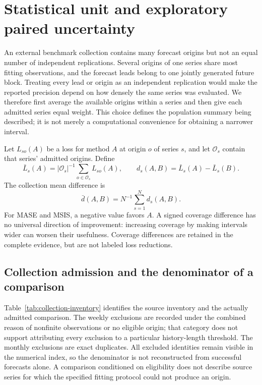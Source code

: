 \section{Statistical unit and exploratory paired uncertainty}
\label{sec:paired-uncertainty}

An external benchmark collection contains many forecast origins but not an
equal number of independent replications. Several origins of one series share
most fitting observations, and the forecast leads belong to one jointly
generated future block. Treating every lead or origin as an independent
replication would make the reported precision depend on how densely the same
series was evaluated. We therefore first average the available origins within
a series and then give each admitted series equal weight. This choice defines
the population summary being described; it is not merely a computational
convenience for obtaining a narrower interval.

Let $L_{so}(A)$ be a loss for method $A$ at origin $o$ of series $s$, and let
$\mathcal O_s$ contain that series' admitted origins. Define
\begin{equation}
 \bar L_s(A)=|\mathcal O_s|^{-1}\sum_{o\in\mathcal O_s}L_{so}(A),
 \qquad d_s(A,B)=\bar L_s(A)-\bar L_s(B).
 \label{eq:paired-series-loss}
\end{equation}
The collection mean difference is
\begin{equation}
 \bar d(A,B)=N^{-1}\sum_{s=1}^N d_s(A,B).
 \label{eq:paired-collection}
\end{equation}
For MASE and MSIS, a negative value favors $A$. A signed coverage difference
has no universal direction of improvement: increasing coverage by making
intervals wider can worsen their usefulness. Coverage differences are retained
in the complete evidence, but are not labeled loss reductions.

\subsection{Collection admission and the denominator of a comparison}
\label{sec:collection-admission}

Table~\ref{tab:collection-inventory} identifies the source inventory and the
actually admitted comparison. The weekly exclusions are recorded under the
combined reason of nonfinite observations or no eligible origin; that category
does not support attributing every exclusion to a particular history-length
threshold. The monthly exclusions are exact duplicates. All excluded identities
remain visible in the numerical index, so the denominator is not reconstructed
from successful forecasts alone. A comparison conditioned on eligibility does
not describe source series for which the specified fitting protocol could not
produce an origin.


